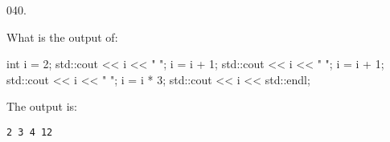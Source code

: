 \documentclass[]{book}
\newenvironment{Shaded}{}{}
\newcommand{\BuiltInTok}[1]{#1}
\newcommand{\DataTypeTok}[1]{\textcolor[rgb]{0.56,0.13,0.00}{#1}}
\newcommand{\DecValTok}[1]{\textcolor[rgb]{0.25,0.63,0.44}{#1}}
\newcommand{\NormalTok}[1]{#1}
\newcommand{\StringTok}[1]{\textcolor[rgb]{0.25,0.44,0.63}{#1}}
\begin{document}
\begin{minipage}{\linewidth}\noindent
{\tiny 040.}\\
\begin{minipage}[t]{.485\linewidth}

What is the output of:

\begin{framed}

\begin{Shaded}
\begin{Highlighting}[]
\DataTypeTok{int}\NormalTok{ i = }\DecValTok{2}\NormalTok{;}
\BuiltInTok{std::}\NormalTok{cout << i << }\StringTok{" "}\NormalTok{;}
\NormalTok{i = i + }\DecValTok{1}\NormalTok{;}
\BuiltInTok{std::}\NormalTok{cout << i << }\StringTok{" "}\NormalTok{;}
\NormalTok{i = i + }\DecValTok{1}\NormalTok{;}
\BuiltInTok{std::}\NormalTok{cout << i << }\StringTok{" "}\NormalTok{;}
\NormalTok{i = i * }\DecValTok{3}\NormalTok{;}
\BuiltInTok{std::}\NormalTok{cout << i << }\BuiltInTok{std::}\NormalTok{endl;}
\end{Highlighting}
\end{Shaded}

\end{framed}

\end{minipage}
\hfill
\begin{minipage}[t]{.485\linewidth}

The output is:

\begin{framed}

\begin{verbatim}
2 3 4 12
\end{verbatim}

\end{framed}

\end{minipage}
\end{minipage}

\vspace{2mm}\noindent\hrulefill{}
\end{document}
